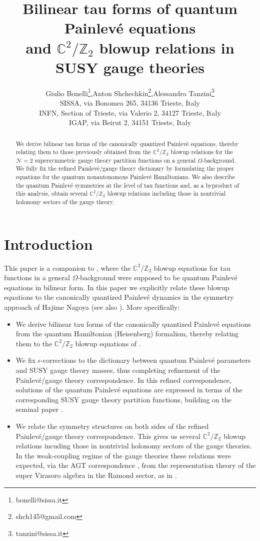 \documentclass[12pt,a4paper]{article}
\title{Bilinear tau forms of quantum Painlev\'e equations
\\
and $\mathbb{C}^2/\mathbb{Z}_2$ blowup relations in SUSY gauge theories}
\author{Giulio Bonelli\thanks{bonelli@sissa.it},\qquad Anton Shchechkin\thanks{shch145@gmail.com},\qquad Alessandro Tanzini\thanks{tanzini@sissa.it}\\
{\small
SISSA, via Bonomea 265, 34136 Trieste, Italy}
\\ {\small INFN, Section of Trieste, 
via Valerio 2, 34127 Trieste, Italy}\\ {\small  IGAP, via Beirut 2, 34151 Trieste, Italy}}
\date{}
\numberwithin{equation}{section}
\begin{document}
\maketitle

\begin{abstract}
We derive bilinear tau forms of the canonically quantized Painlev\'e equations, thereby relating them to those previously obtained from the $\mathbb{C}^2/\mathbb{Z}_2$ blowup relations for the $\mathcal{N}=2$ supersymmetric gauge theory partition functions on a general $\Omega$-background. 
We fully fix the refined Painlev\'e/gauge theory dictionary by formulating the proper equations for the quantum nonautonomous Painlev\'e Hamiltonians. 
We also describe the quantum Painlev\'e symmetries at the level of tau functions and, as a byproduct of this analysis, obtain several $\mathbb{C}^2/\mathbb{Z}_2$ blowup relations including those in nontrivial holonomy sectors of the gauge theory.
\end{abstract}

\begin{quote}
\tableofcontents
\end{quote}

\setcounter{section}{-1}
\section{Introduction}
\label{sec:intro}

This paper is a companion to \cite{BST25}, where the $\mathbb{C}^2/\mathbb{Z}_2$ blowup equations \cite{BMT1106,BMT1107,BBFLT11} for tau functions in a general $\Omega$-background were supposed to be quantum Painlev\'e equations in bilinear form. In this paper we explicitly relate these blowup equations to 
the canonically quantized Painlev\'e dynamics in the symmetry approach of Hajime Nagoya \cite{N04,N09,N12} (see also \cite{JNS08,NY12}). 
More specifically:
\begin{itemize}
    \item We derive bilinear tau forms of the canonically quantized Painlev\'e equations from the quantum Hamiltonian (Heisenberg) formalism, thereby relating them to the $\mathbb{C}^2/\mathbb{Z}_2$ blowup equations of \cite{BST25}.
    \item We fix $\epsilon$-corrections to the dictionary between  quantum Painlev\'e parameters and SUSY gauge theory masses, thus completing refinement of the Painlev\'e/gauge theory correspondence. In this refined correspondence, solutions of the quantum Painlev\'e equations are expressed in terms of the corresponding SUSY gauge theory partition functions, building on the seminal paper \cite{GIL12}.
    \item We relate the symmetry structures on both sides of the refined Painlev\'e/gauge theory correspondence. This gives us several $\mathbb{C}^2/\mathbb{Z}_2$ blowup relations incuding those in nontrivial holonomy sectors of the gauge theories. In the weak-coupling regime of the gauge theories these relations were expected, via the AGT correspondence \cite{AGT09}, from
    the representation theory of the super Virasoro algebra in the Ramond sector, as in \cite{BS16b}.
\end{itemize}
\end{document}
